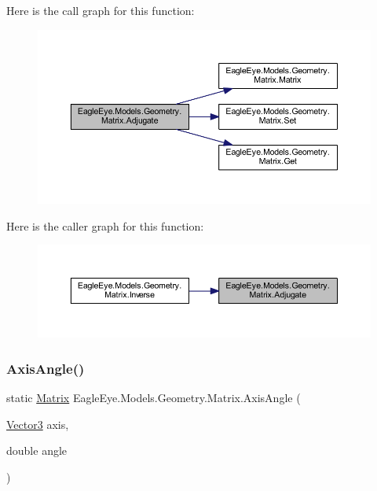 Here is the call graph for this function\+:\nopagebreak
\begin{figure}[H]
\begin{center}
\leavevmode
\includegraphics[width=350pt]{class_eagle_eye_1_1_models_1_1_geometry_1_1_matrix_a50a22a69e3975db229558520997b91a2_cgraph}
\end{center}
\end{figure}
Here is the caller graph for this function\+:\nopagebreak
\begin{figure}[H]
\begin{center}
\leavevmode
\includegraphics[width=350pt]{class_eagle_eye_1_1_models_1_1_geometry_1_1_matrix_a50a22a69e3975db229558520997b91a2_icgraph}
\end{center}
\end{figure}
\mbox{\label{class_eagle_eye_1_1_models_1_1_geometry_1_1_matrix_af76e4c9c86e25fab681c2f7a652541c4}} 
\subsubsection{\texorpdfstring{AxisAngle()}{AxisAngle()}}
{\footnotesize\ttfamily static \mbox{\hyperlink{class_eagle_eye_1_1_models_1_1_geometry_1_1_matrix}{Matrix}} Eagle\+Eye.\+Models.\+Geometry.\+Matrix.\+Axis\+Angle (\begin{DoxyParamCaption}\item[{\mbox{\hyperlink{struct_eagle_eye_1_1_models_1_1_geometry_1_1_vector3}{Vector3}}}]{axis,  }\item[{double}]{angle }\end{DoxyParamCaption})\hspace{0.3cm}{\ttfamily [static]}}

